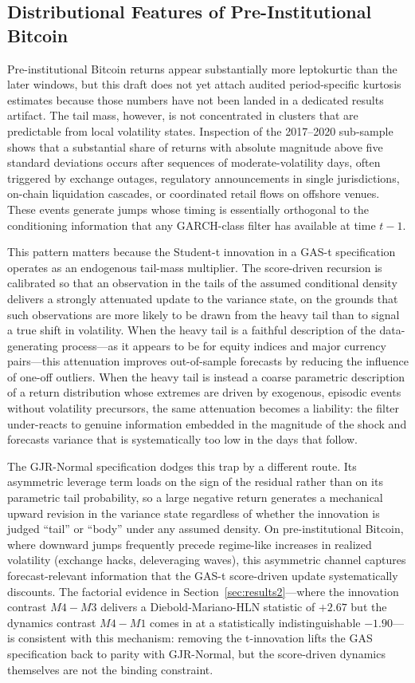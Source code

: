 \subsection{Distributional Features of Pre-Institutional Bitcoin}

Pre-institutional Bitcoin returns appear substantially more leptokurtic than the later windows, but this draft does not yet attach audited period-specific kurtosis estimates because those numbers have not been landed in a dedicated results artifact. The tail mass, however, is not concentrated in clusters that are predictable from local volatility states. Inspection of the 2017--2020 sub-sample shows that a substantial share of returns with absolute magnitude above five standard deviations occurs after sequences of moderate-volatility days, often triggered by exchange outages, regulatory announcements in single jurisdictions, on-chain liquidation cascades, or coordinated retail flows on offshore venues. These events generate jumps whose timing is essentially orthogonal to the conditioning information that any GARCH-class filter has available at time $t-1$.

This pattern matters because the Student-t innovation in a GAS-t specification operates as an endogenous tail-mass multiplier. The score-driven recursion is calibrated so that an observation in the tails of the assumed conditional density delivers a strongly attenuated update to the variance state, on the grounds that such observations are more likely to be drawn from the heavy tail than to signal a true shift in volatility. When the heavy tail is a faithful description of the data-generating process---as it appears to be for equity indices and major currency pairs---this attenuation improves out-of-sample forecasts by reducing the influence of one-off outliers. When the heavy tail is instead a coarse parametric description of a return distribution whose extremes are driven by exogenous, episodic events without volatility precursors, the same attenuation becomes a liability: the filter under-reacts to genuine information embedded in the magnitude of the shock and forecasts variance that is systematically too low in the days that follow.

The GJR-Normal specification dodges this trap by a different route. Its asymmetric leverage term loads on the sign of the residual rather than on its parametric tail probability, so a large negative return generates a mechanical upward revision in the variance state regardless of whether the innovation is judged ``tail'' or ``body'' under any assumed density. On pre-institutional Bitcoin, where downward jumps frequently precede regime-like increases in realized volatility (exchange hacks, deleveraging waves), this asymmetric channel captures forecast-relevant information that the GAS-t score-driven update systematically discounts. The factorial evidence in Section~\ref{sec:results2}---where the innovation contrast $M4 - M3$ delivers a Diebold-Mariano-HLN statistic of $+2.67$ but the dynamics contrast $M4 - M1$ comes in at a statistically indistinguishable $-1.90$---is consistent with this mechanism: removing the t-innovation lifts the GAS specification back to parity with GJR-Normal, but the score-driven dynamics themselves are not the binding constraint.

